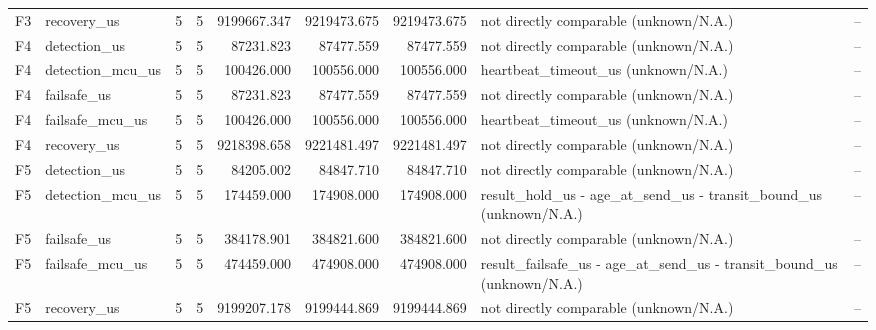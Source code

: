 \begin{tabular}{llrrrrrlr}
F3 & recovery\_us & 5 & 5 & 9199667.347 & 9219473.675 & 9219473.675 & not directly comparable (unknown/N.A.) & -- \\
F4 & detection\_us & 5 & 5 & 87231.823 & 87477.559 & 87477.559 & not directly comparable (unknown/N.A.) & -- \\
F4 & detection\_mcu\_us & 5 & 5 & 100426.000 & 100556.000 & 100556.000 & heartbeat\_timeout\_us (unknown/N.A.) & -- \\
F4 & failsafe\_us & 5 & 5 & 87231.823 & 87477.559 & 87477.559 & not directly comparable (unknown/N.A.) & -- \\
F4 & failsafe\_mcu\_us & 5 & 5 & 100426.000 & 100556.000 & 100556.000 & heartbeat\_timeout\_us (unknown/N.A.) & -- \\
F4 & recovery\_us & 5 & 5 & 9218398.658 & 9221481.497 & 9221481.497 & not directly comparable (unknown/N.A.) & -- \\
F5 & detection\_us & 5 & 5 & 84205.002 & 84847.710 & 84847.710 & not directly comparable (unknown/N.A.) & -- \\
F5 & detection\_mcu\_us & 5 & 5 & 174459.000 & 174908.000 & 174908.000 & result\_hold\_us - age\_at\_send\_us - transit\_bound\_us (unknown/N.A.) & -- \\
F5 & failsafe\_us & 5 & 5 & 384178.901 & 384821.600 & 384821.600 & not directly comparable (unknown/N.A.) & -- \\
F5 & failsafe\_mcu\_us & 5 & 5 & 474459.000 & 474908.000 & 474908.000 & result\_failsafe\_us - age\_at\_send\_us - transit\_bound\_us (unknown/N.A.) & -- \\
F5 & recovery\_us & 5 & 5 & 9199207.178 & 9199444.869 & 9199444.869 & not directly comparable (unknown/N.A.) & -- \\
\end{tabular}

